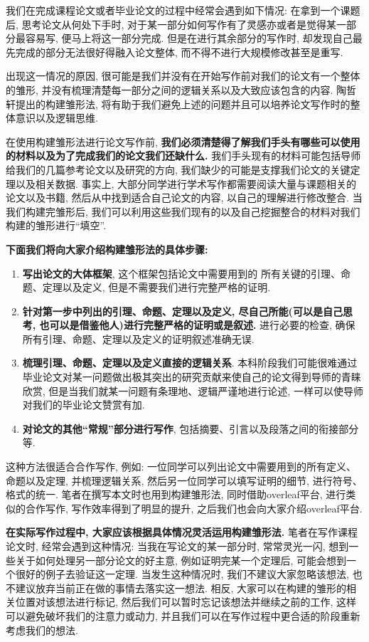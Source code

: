 \documentclass{formatBook}
\begin{document}
我们在完成课程论文或者毕业论文的过程中经常会遇到如下情况: 在拿到一个课题后, 思考论文从何处下手时, 对于某一部分如何写作有了灵感亦或者是觉得某一部分最容易写, 便马上将这一部分完成. 但是在进行其余部分的写作时, 却发现自己最先完成的部分无法很好得融入论文整体, 而不得不进行大规模修改甚至是重写. \par
出现这一情况的原因, 很可能是我们并没有在开始写作前对我们的论文有一个整体的雏形, 并没有梳理清楚每一部分之间的逻辑关系以及大致应该包含的内容. 陶哲轩提出的构建雏形法, 将有助于我们避免上述的问题并且可以培养论文写作时的整体意识以及逻辑思维. \par
在使用构建雏形法进行论文写作前, \textbf{我们必须清楚得了解我们手头有哪些可以使用的材料以及为了完成我们的论文我们还缺什么.} 我们手头现有的材料可能包括导师给我们的几篇参考论文以及研究的方向, 我们缺少的可能是支撑我们论文的关键定理以及相关数据. 事实上, 大部分同学进行学术写作都需要阅读大量与课题相关的论文以及书籍, 然后从中找到适合自己论文的内容, 以自己的理解进行修改整合. 当我们构建完雏形后, 我们可以利用这些我们现有的以及自己挖掘整合的材料对我们构建的雏形进行“填空”. \par
\textbf{下面我们将向大家介绍构建雏形法的具体步骤: }
\begin{enumerate}
    \item \textbf{写出论文的大体框架}, 这个框架包括论文中需要用到的 所有关键的引理、命题、定理以及定义, 但是不需要我们进行完整严格的证明. 
    \item \textbf{针对第一步中列出的引理、命题、定理以及定义, 尽自己所能(可以是自己思考, 也可以是借鉴他人)进行完整严格的证明或是叙述. }进行必要的检查, 确保所有引理、命题、定理以及定义的证明叙述准确无误. 
    \item \textbf{梳理引理、命题、定理以及定义直接的逻辑关系}. 本科阶段我们可能很难通过毕业论文对某一问题做出极其突出的研究贡献来使自己的论文得到导师的青睐欣赏, 但是当我们就某一问题有条理地、逻辑严谨地进行论述, 一样可以使导师对我们的毕业论文赞赏有加. 
    \item \textbf{对论文的其他“常规”部分进行写作}, 包括摘要、引言以及段落之间的衔接部分等. 
\end{enumerate}
\par
这种方法很适合合作写作, 例如: 一位同学可以列出论文中需要用到的所有定义、命题以及定理, 并梳理逻辑关系, 然后另一位同学可以填写证明的细节, 进行符号、格式的统一. 笔者在撰写本文时也用到构建雏形法, 同时借助overleaf平台, 进行类似的合作写作, 写作效率得到了明显的提升, 之后我们也会向大家介绍overleaf平台. \par
\textbf{在实际写作过程中, 大家应该根据具体情况灵活运用构建雏形法. }笔者在写作课程论文时, 经常会遇到这种情况: 当我在写论文的某一部分时, 常常灵光一闪, 想到一些关于如何处理另一部分论文的好主意, 例如证明完某一个定理后, 可能会想到一个很好的例子去验证这一定理. 当发生这种情况时, 我们不建议大家忽略该想法, 也不建议放弃当前正在做的事情去落实这一想法. 相反, 大家可以在构建的雏形的相关位置对该想法进行标记, 然后我们可以暂时忘记该想法并继续之前的工作, 这样可以避免破坏我们的注意力或动力, 并且我们可以在写作过程中更合适的阶段重新考虑我们的想法. 
\end{document}
